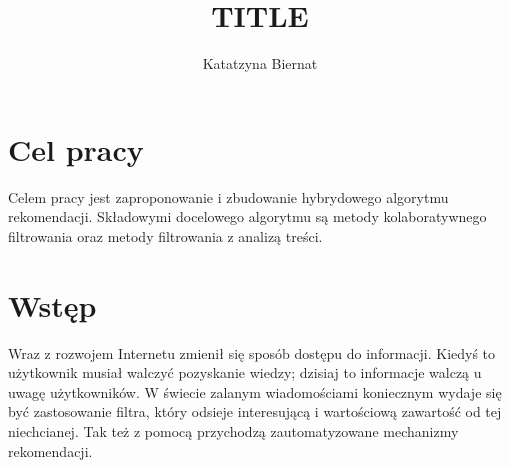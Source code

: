\documentclass[twoside]{iisthesis}
\newcommand{\myfigure}[1]{%
\addcontentsline{figu}{myfigure}{\protect\numberline{\thefigure}#1}\par}
\begin{document}
\newcommand{\resultChart}[7][140]{
\def\dataS{{#2}}
	\begin{figure}[H]
	
\centering

\begin{center}
\begin{tikzpicture}
 
\begin{axis}[
ybar,
bar width=20,
legend style={at={(0.5,-0.25)},
anchor=north,legend columns=-1},
ylabel={Wartość miary},
symbolic x coords={\dataS},
xtick=data,
height=  {#1},
width=0.8\textwidth,
ymin=0, ytick={0,0.5,1},
ymax=1.5,
nodes near coords,
nodes near coords align={vertical},
]
\addplot coordinates { (\dataS,{#3}) };
\addplot coordinates {(\dataS,{#4}) };
\addplot coordinates { (\dataS,{#5}) };
\legend{Recall,Precission,F1-Score}
\end{axis}
\end{tikzpicture}
\end{center}
\caption{{#6}}
\myfigure{{#6}}
\label{{#7}}
\end{figure}
}


%
\nocite{*}
\title{ TITLE }
\author{Katatzyna Biernat }

\date{\number\the\year}




\maketitle
\textpages


\graphicspath{ {img/} }

 \chapter{Cel pracy}
	Celem pracy jest zaproponowanie i zbudowanie hybrydowego algorytmu rekomendacji. Składowymi docelowego algorytmu są metody kolaboratywnego filtrowania oraz metody filtrowania z analizą treści.  
 
 \chapter{Wstęp}
	 Wraz z rozwojem Internetu zmienił się sposób dostępu do informacji. Kiedyś to użytkownik musiał walczyć pozyskanie wiedzy; dzisiaj to informacje walczą u uwagę użytkowników. W świecie zalanym wiadomościami koniecznym wydaje się być zastosowanie filtra, który odsieje interesującą  i wartościową zawartość od tej niechcianej. Tak też z pomocą przychodzą zautomatyzowane mechanizmy rekomendacji.
	 
\end{document}
